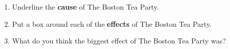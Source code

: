\documentclass[12pt]{article}
\begin{document}
\begin{tcolorbox}[colframe=black!60, colback=white, 
coltitle=black, colbacktitle=black!15, fonttitle=\bfseries\Large, 
title=Guided Practice, halign title=center, left=10pt, right=10pt, top=10pt, bottom=15pt]

\begin{enumerate}[itemsep=4em] %
    \item Underline the \textbf{cause} of The Boston Tea Party.
    \item Put a box around each of the \textbf{effects} of The Boston Tea Party.
    \item What do you think the biggest effect of The Boston Tea Party was?
\\[0.8cm] \underline{\hspace{15cm}}  
    \\[0.8cm] \underline{\hspace{15cm}}  
    \\[0.8cm] \underline{\hspace{15cm}}  
\end{enumerate}

\end{tcolorbox}

\vspace{1em}
\end{document}
